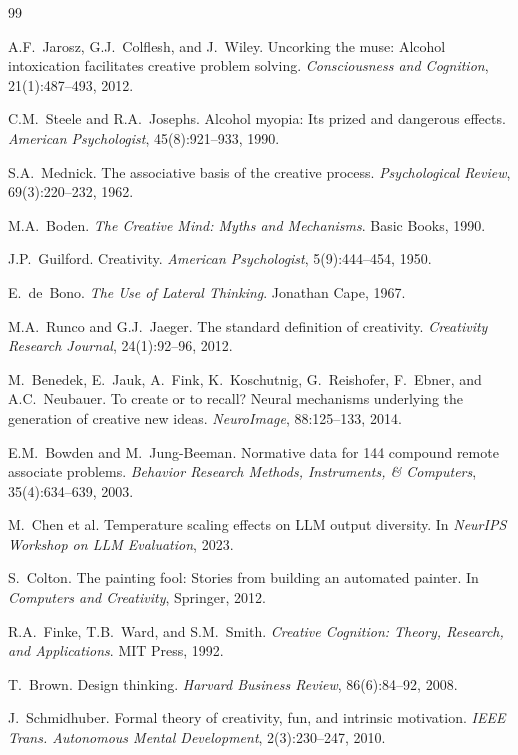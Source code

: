 \documentclass[11pt,a4paper]{article}
\begin{document}

\begin{thebibliography}{99}

A.F.~Jarosz, G.J.~Colflesh, and J.~Wiley.
\newblock Uncorking the muse: Alcohol intoxication facilitates creative problem solving.
\newblock \textit{Consciousness and Cognition}, 21(1):487--493, 2012.

C.M.~Steele and R.A.~Josephs.
\newblock Alcohol myopia: Its prized and dangerous effects.
\newblock \textit{American Psychologist}, 45(8):921--933, 1990.

S.A.~Mednick.
\newblock The associative basis of the creative process.
\newblock \textit{Psychological Review}, 69(3):220--232, 1962.

M.A.~Boden.
\newblock \textit{The Creative Mind: Myths and Mechanisms}.
\newblock Basic Books, 1990.

J.P.~Guilford.
\newblock Creativity.
\newblock \textit{American Psychologist}, 5(9):444--454, 1950.

E.~de~Bono.
\newblock \textit{The Use of Lateral Thinking}.
\newblock Jonathan Cape, 1967.

M.A.~Runco and G.J.~Jaeger.
\newblock The standard definition of creativity.
\newblock \textit{Creativity Research Journal}, 24(1):92--96, 2012.

M.~Benedek, E.~Jauk, A.~Fink, K.~Koschutnig, G.~Reishofer, F.~Ebner, and A.C.~Neubauer.
\newblock To create or to recall? Neural mechanisms underlying the generation of creative new ideas.
\newblock \textit{NeuroImage}, 88:125--133, 2014.

E.M.~Bowden and M.~Jung-Beeman.
\newblock Normative data for 144 compound remote associate problems.
\newblock \textit{Behavior Research Methods, Instruments, \& Computers}, 35(4):634--639, 2003.

M.~Chen et al.
\newblock Temperature scaling effects on LLM output diversity.
\newblock In \textit{NeurIPS Workshop on LLM Evaluation}, 2023.

S.~Colton.
\newblock The painting fool: Stories from building an automated painter.
\newblock In \textit{Computers and Creativity}, Springer, 2012.

R.A.~Finke, T.B.~Ward, and S.M.~Smith.
\newblock \textit{Creative Cognition: Theory, Research, and Applications}.
\newblock MIT Press, 1992.

T.~Brown.
\newblock Design thinking.
\newblock \textit{Harvard Business Review}, 86(6):84--92, 2008.

J.~Schmidhuber.
\newblock Formal theory of creativity, fun, and intrinsic motivation.
\newblock \textit{IEEE Trans. Autonomous Mental Development}, 2(3):230--247, 2010.

\end{thebibliography}
\end{document}
